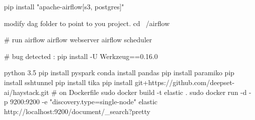 pip install "apache-airflow[s3, postgres]"

modify dag folder to point to you project.
cd ~/airflow

# run airflow
airflow webserver
airflow scheduler

# bug detected :
pip install -U Werkzeug==0.16.0


python 3.5
pip install pyspark 
conda install pandas 
pip install paramiko
pip install sshtunnel
pip install tika
pip install git+https://github.com/deepset-ai/haystack.git
# on Dockerfile
sudo docker build -t elastic .
sudo docker run -d -p 9200:9200 -e "discovery.type=single-node" elastic
http://localhost:9200/document/_search?pretty